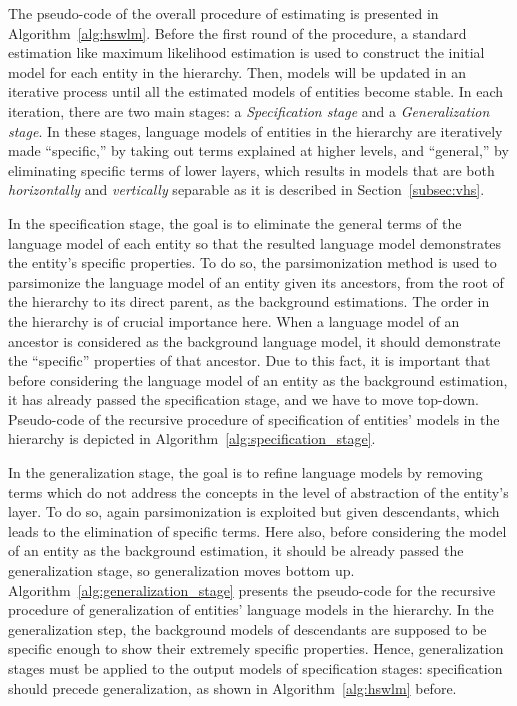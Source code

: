 The pseudo-code of the overall procedure of estimating \achswlm is presented in Algorithm~\ref{alg:hswlm}. 
Before the first round of the procedure, a standard estimation like maximum likelihood estimation is used to construct the initial model for each entity in the hierarchy. 
Then, models will be updated in an iterative process until all the estimated models of entities become stable. 
In each iteration, there are two main stages: a \emph{Specification stage} and a \emph{Generalization stage}. 
In these stages, language models of entities in the hierarchy are iteratively made ``specific,'' by taking out terms explained at higher levels, and ``general,'' by eliminating specific terms of lower layers, which results in models that are both \emph{horizontally} and \emph{vertically} separable as it is described in Section~\ref{subsec:vhs}.

In the specification stage, the goal is to eliminate the general terms of the language model of each entity so that the resulted language model demonstrates the entity's specific properties.  
To do so, the parsimonization method is used to parsimonize the language model of an entity given its ancestors, from the root of the hierarchy to its direct parent, as the background estimations. 
%
The order in the hierarchy is of crucial importance here. 
When a language model of an ancestor is considered as the background language model, it should demonstrate the ``specific'' properties of that ancestor. Due to this fact, it is important that before considering the language model of an entity as the background estimation, it has already passed the specification stage, and we have to move top-down.
Pseudo\:-\:code of the recursive procedure of specification of entities' models in the hierarchy is depicted in Algorithm~\ref{alg:specification_stage}.




In the generalization stage, the goal is to refine language models by removing terms which do not address the concepts in the level of abstraction of the entity's layer.
To do so, again parsimonization is exploited but given descendants, which leads to the elimination of specific terms. 
Here also, before considering the model of an entity as the background estimation, it should be already passed the generalization stage, so generalization moves bottom up.
Algorithm~\ref{alg:generalization_stage} presents the pseudo\:-\:code for the recursive procedure of generalization of entities' language models in the hierarchy. 
In the generalization step, the background models of descendants are supposed to be specific enough to show their extremely specific properties. Hence, generalization stages must be applied to the output models of specification stages: specification should precede generalization, as shown in Algorithm~\ref{alg:hswlm} before.
